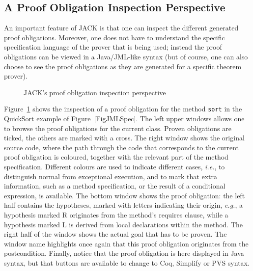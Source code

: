 \subsection{A Proof Obligation Inspection Perspective}

An important feature of JACK is that one can inspect the different
generated proof obligations. Moreover, one does not have to understand
the specific specification language of the prover that is being used;
instead the proof obligations can be viewed in a Java/JML-like syntax
(but of course, one can also choose to see the proof obligations as
they are generated for a specific theorem prover).

\begin{figure}[t!]
\caption{JACK's proof obligation inspection perspective}\label{FigJackPerspective}
\end{figure}


Figure~\ref{FigJackPerspective} shows the inspection of a proof
obligation for the method \texttt{sort} in the QuickSort example of
Figure~\ref{FigJMLSpec}. The left upper windows allows one to browse
the proof obligations for the current class. Proven obligations are
ticked, the others are marked with a cross. The right window shows the
original source code, where the path through the code that corresponds
to the current proof obligation is coloured, together with the
relevant part of the method specification. Different colours are used
to indicate different cases, \emph{i.e.}, to distinguish normal from
exceptional execution, and to mark that extra information, such as a
method specification, or the result of a conditional expression, is
available.  The bottom window shows the proof obligation: the left
half contains the hypotheses, marked with letters indicating their
origin, \emph{e.g.}, a hypothesis marked R originates from the
method's requires clause, while a hypothesis marked L is derived from
local declarations within the method. The right half of the window
shows the actual goal that has to be proven. The window name
highlights once again that this proof obligation originates from the
postcondition. Finally, notice that the proof obligation is here
displayed in Java syntax, but that buttons are available to change to
Coq, Simplify or PVS syntax.

